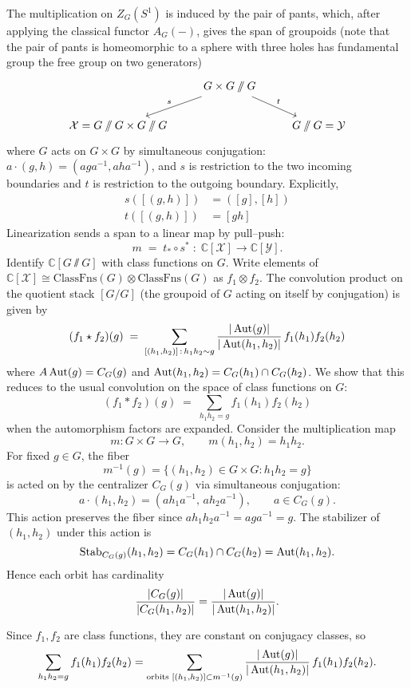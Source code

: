 \documentclass[12pt]{article}
\begin{document}
\begin{example}
The multiplication on $Z_G(S^1)$ is induced by the pair of pants, which, after applying the classical functor $A_G(-)$, gives the span of groupoids (note that the pair of pants is homeomorphic to a sphere with three holes has fundamental group the free group on two generators)
\[
\begin{tikzcd}
& G\times G \sslash G \arrow[dl, "s"'] \arrow[dr, "t"] & \\
\cX = G\sslash G \times G\sslash G & & G\sslash G = \cY
\end{tikzcd}
\]
where $G$ acts on $G\times G$ by simultaneous conjugation:
$a\cdot(g,h)=(aga^{-1},aha^{-1})$, and $s$ is restriction to the two incoming boundaries and $t$ is restriction to the outgoing boundary. Explicitly,
\begin{align*}
s([(g,h)]) & = ([g],[h]) \\
t([(g,h)]) & = [gh]
\end{align*}
Linearization sends a span to a linear map by pull--push:
\[m \;=\; t_* \circ s^* \;:\; \mathbb{C}[\mathcal X]\longrightarrow \mathbb{C}[\mathcal Y].\]
Identify $\mathbb{C}[G\sslash G]$ with class functions on $G$. Write elements of
$\mathbb{C}[\mathcal X]\cong \mathrm{ClassFns}(G)\otimes \mathrm{ClassFns}(G)$ as $f_1\otimes f_2$. The convolution product on the quotient stack $[G/G]$ (the groupoid of $G$ acting on itself by conjugation) is given by
\[
(f_1 \star f_2)(g)
\;=\;
\sum_{[(h_1,h_2)]\,:\,h_1h_2\sim g}
\frac{|\operatorname{Aut}(g)|}{|\operatorname{Aut}(h_1,h_2)|}\,f_1(h_1)f_2(h_2)
\] where $A\operatorname{Aut}(g)=C_G(g)$ and $\operatorname{Aut}(h_1,h_2)=C_G(h_1)\cap C_G(h_2)$. We show that this reduces to the usual convolution on the space of class functions on $G$:
\[
(f_1 * f_2)(g)
\;=\;
\sum_{h_1h_2=g} f_1(h_1)f_2(h_2)
\]
when the automorphism factors are expanded. Consider the multiplication map
\[
m \colon G\times G \longrightarrow G,
\qquad
m(h_1,h_2)=h_1h_2.
\]
For fixed $g\in G$, the fiber
\[
m^{-1}(g)
=\{(h_1,h_2)\in G\times G : h_1h_2=g\}
\]
is acted on by the centralizer $C_G(g)$ via simultaneous conjugation:
\[
a\cdot(h_1,h_2)=(a h_1 a^{-1},\, a h_2 a^{-1}),
\qquad a\in C_G(g).
\]
This action preserves the fiber since $a h_1 h_2 a^{-1}=a g a^{-1}=g$.  
The stabilizer of $(h_1,h_2)$ under this action is
\[
\operatorname{Stab}_{C_G(g)}(h_1,h_2)
= C_G(h_1)\cap C_G(h_2)
= \operatorname{Aut}(h_1,h_2).
\]
Hence each orbit has cardinality
\[
\frac{|C_G(g)|}{|C_G(h_1,h_2)|}
=\frac{|\operatorname{Aut}(g)|}{|\operatorname{Aut}(h_1,h_2)|}.
\]

Since $f_1,f_2$ are class functions, they are constant on conjugacy classes, so
\[
\sum_{h_1h_2=g} f_1(h_1)f_2(h_2)
= \sum_{\text{orbits }[(h_1,h_2)]\subset m^{-1}(g)}
\frac{|\operatorname{Aut}(g)|}{|\operatorname{Aut}(h_1,h_2)|}
\,f_1(h_1)f_2(h_2).
\]
\end{example}
\end{document}
